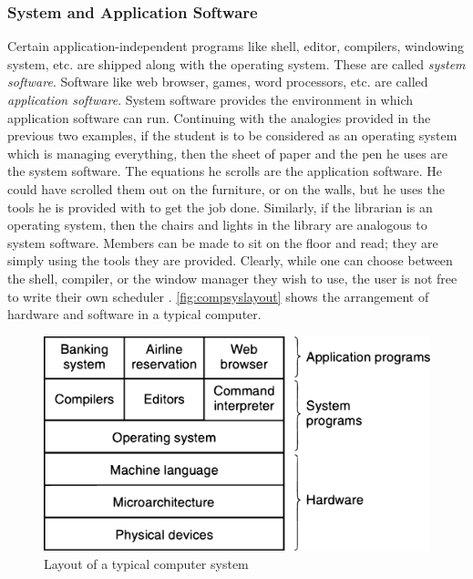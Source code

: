 \subsubsection{System and Application Software}
Certain application-independent programs like shell, editor, compilers, windowing system, etc. are shipped along with the operating system. These are called \textit{system software}. Software like web browser, games, word processors, etc. are called \textit{application software}. System software provides the environment in which application software can run. Continuing with the analogies provided in the previous two examples, if the student is to be considered as an operating system which is managing everything, then the sheet of paper and the pen he uses are the system software. The equations he scrolls are the application software. He could have scrolled them out on the furniture, or on the walls, but he uses the tools he is provided with to get the job done. Similarly, if the librarian is an operating system, then the chairs and lights in the library are analogous to system software. Members can be made to sit on the floor and read; they are simply using the tools they are provided. Clearly, while one can choose between the shell, compiler, or the window manager they wish to use, the user is not free to write their own scheduler \citep{tannenbaum2003operating}. \autoref{fig:compsyslayout} shows the arrangement of hardware and software in a typical computer.
\begin{figure}[h]
\centering
\includegraphics[scale=0.22]{figures/comp_sys_layout.eps}
\caption{Layout of a typical computer system \cite{tannenbaum2003operating}}
\label{fig:compsyslayout}
\end{figure}

